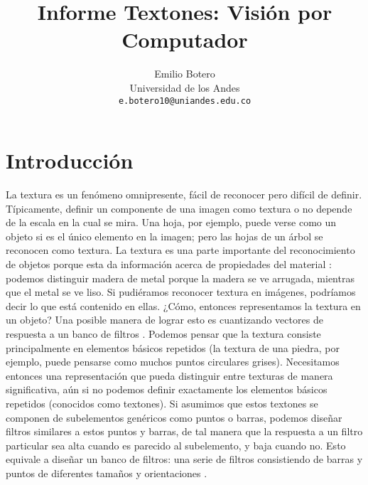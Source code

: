 \documentclass[10pt,twocolumn,letterpaper]{article}
\begin{document}
\title{Informe Textones: Visión por Computador}

\author{Emilio Botero\\
Universidad de los Andes\\
{\tt\small e.botero10@uniandes.edu.co}
}

\maketitle


\section{Introducción}
La textura es un fenómeno omnipresente, fácil de reconocer pero difícil de definir. Típicamente, definir un componente de una imagen como textura o no depende de la escala en la cual se mira. Una hoja, por ejemplo, puede verse como un objeto si es el único elemento en la imagen; pero las hojas de un árbol se reconocen como textura. La textura es una parte importante del reconocimiento de objetos porque esta da información acerca de propiedades del material \cite{forsyth}: podemos distinguir madera de metal porque la madera se ve arrugada, mientras que el metal se ve liso. Si pudiéramos reconocer textura en imágenes, podríamos decir lo que está contenido en ellas. ¿Cómo, entonces representamos la textura en un objeto? Una posible manera de lograr esto es cuantizando vectores de respuesta a un banco de filtros \cite{3_malik_belongie_leung_shi_2001}. Podemos pensar que la textura consiste principalmente en elementos básicos repetidos (la textura de una piedra, por ejemplo, puede pensarse como muchos puntos circulares grises). Necesitamos entonces una representación que pueda distinguir entre texturas de manera significativa, aún si no podemos definir exactamente los elementos básicos repetidos (conocidos como textones). Si asumimos que estos textones se componen de subelementos genéricos como puntos o barras, podemos diseñar filtros similares a estos puntos y barras, de tal manera que la respuesta a un filtro particular sea alta cuando es parecido al subelemento, y baja cuando no. Esto equivale a diseñar un banco de filtros: una serie de filtros consistiendo de barras y puntos de diferentes tamaños y orientaciones \cite{forsyth}.
\end{document}
